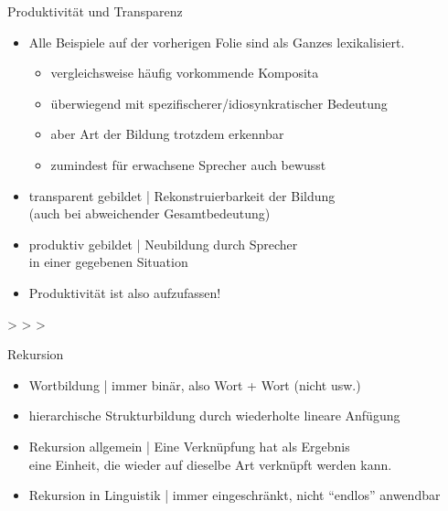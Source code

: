 \begin{frame}
  {Produktivität und Transparenz}
  \onslide<+->
  \begin{itemize}[<+->]
    \item \alert{Alle} Beispiele auf der vorherigen Folie sind als Ganzes \alert{lexikalisiert}.
      \begin{itemize}[<+->]
        \item vergleichsweise häufig vorkommende Komposita
        \item überwiegend mit spezifischerer\slash idiosynkratischer Bedeutung
        \item aber Art der Bildung trotzdem erkennbar
        \item zumindest für erwachsene Sprecher auch bewusst
      \end{itemize}
      \Halbzeile
    \item \alert{transparent gebildet} | Rekonstruierbarkeit der Bildung\\
      (auch bei abweichender Gesamtbedeutung)
      \Halbzeile
    \item \alert{produktiv gebildet} | Neubildung durch Sprecher\\
      in einer gegebenen Situation
    \item Produktivität ist also  aufzufassen!
  \end{itemize}
  \onslide<+->
  \centering 
  \Halbzeile
   >  >  > 
\end{frame}

\begin{frame}[fragile,label=hierarchie]
  {Rekursion}
  \onslide<+->
  \onslide<+->
  \begin{center}
    \scalebox{0.7}{
      \begin{forest}
        [Bushaltestellenunterstandsreparatur
          [Bushaltestellenunterstand
            [Bushaltestelle
              [Bus]
              [Haltestelle
                [halten]
                [Stelle]
              ]
            ]
            [Unterstand
              [unter]
              [Stand]
            ]
          ]
          [Reparatur]
        ]
      \end{forest}
    }
  \end{center}
  \begin{itemize}[<+->]
    \item Wortbildung | immer \alert{binär}, also \alert{Wort + Wort} (nicht  usw.)
      \Viertelzeile
    \item \alert{hierarchische Strukturbildung} durch wiederholte lineare Anfügung
      \Viertelzeile
    \item Rekursion allgemein | \alert{Eine Verknüpfung hat als Ergebnis\\
      eine Einheit, die wieder auf dieselbe Art verknüpft werden kann.}
    \item Rekursion in Linguistik | immer eingeschränkt, nicht "`endlos"' anwendbar
  \end{itemize}
\end{frame}

